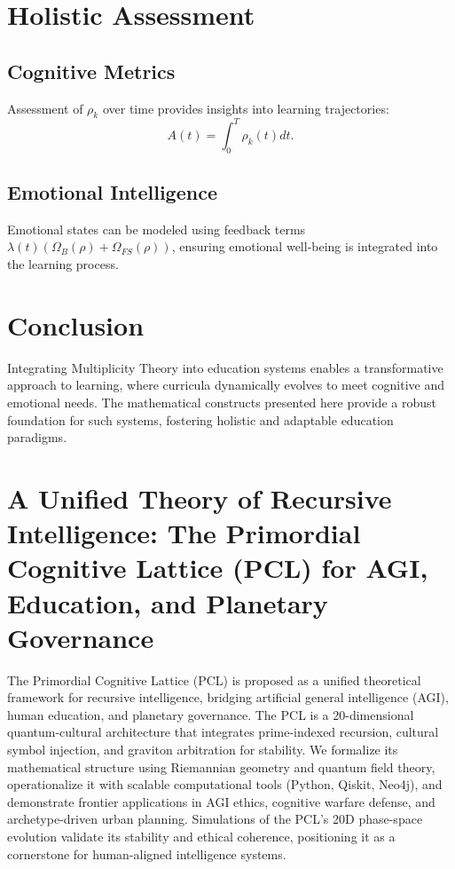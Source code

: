 \documentclass[11pt]{article}
\theoremstyle{plain}
\theoremstyle{definition}
\begin{document}
\section{Holistic Assessment}

\subsection{Cognitive Metrics}
Assessment of \( \rho_k \) over time provides insights into learning trajectories:
\begin{equation}
A(t) = \int_{0}^{T} \rho_k(t) dt.
\end{equation}

\subsection{Emotional Intelligence}
Emotional states can be modeled using feedback terms \( \lambda(t)(\Omega_B(\rho) + \Omega_{FS}(\rho)) \), ensuring emotional well-being is integrated into the learning process.

\section{Conclusion}
Integrating Multiplicity Theory into education systems enables a transformative approach to learning, where curricula dynamically evolves to meet cognitive and emotional needs. The mathematical constructs presented here provide a robust foundation for such systems, fostering holistic and adaptable education paradigms.



\section{A Unified Theory of Recursive Intelligence: The Primordial Cognitive Lattice (PCL) for AGI, Education, and Planetary Governance}

The Primordial Cognitive Lattice (PCL) is proposed as a unified theoretical framework for recursive intelligence, bridging artificial general intelligence (AGI), human education, and planetary governance. The PCL is a 20-dimensional quantum-cultural architecture that integrates prime-indexed recursion, cultural symbol injection, and graviton arbitration for stability. We formalize its mathematical structure using Riemannian geometry and quantum field theory, operationalize it with scalable computational tools (Python, Qiskit, Neo4j), and demonstrate frontier applications in AGI ethics, cognitive warfare defense, and archetype-driven urban planning. Simulations of the PCL's 20D phase-space evolution validate its stability and ethical coherence, positioning it as a cornerstone for human-aligned intelligence systems.
\end{document}
